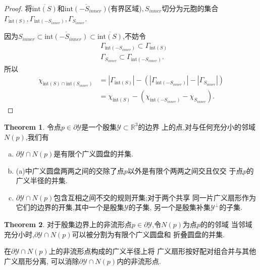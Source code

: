 \documentclass[a4paper]{book}
\numberwithin{equation}{chapter}
\theoremstyle{definition}
\newtheorem{thm}{Theorem}[chapter]
\begin{document}
\begin{proof}
    将$\overline{\text{int}(S)}$和$\overline{\text{int}(-S_{inner})}$(有界区域)$, S_{inner}$切分为元胞的集合
    $\varGamma_{\text{int}(S) }, 
    \varGamma_{\text{int}(-S_{inner})}, \varGamma_{S_{inner}}$.

    因为$ S_{inner} \subset \overline{\text{int}(-S_{inner})} \subset \overline{\text{int}(S)}$,不妨令
    \begin{align}
        &\varGamma_{\text{int}(-S_{inner})}  \subset \varGamma_{\text{int}(S)} \\
        &\varGamma_{S_{inner}} \subset \varGamma_{\text{int}(-S_{inner})} .
    \end{align}
    所以
    \begin{equation}
        \begin{aligned}
            \chi_{\text{int}(S) \cap \text{int}(S_{inner})} &= 
            \left| \varGamma_{\text{int}(S)} \right| - (\left|  \varGamma_{\text{int}(-S_{inner})} \right| 
            -  \left| \varGamma_{S_{inner}} \right|) \\
            &=  \chi_{\text{int}(S)} - (\chi_{\text{int}(-S_{inner})} - \chi_{S_{inner}}).
        \end{aligned}
    \end{equation}
\end{proof}

\begin{thm}
    令点$p \in \partial \mathcal{Y}$是一个殷集$\mathcal{Y} \subset \mathbb{R}^3$的边界
    上的点,对与任何充分小的邻域$N(p)$,我们有
    \begin{enumerate}[(a)]
        \item $\partial \mathcal{Y} \cap N(p)$是有限个广义圆盘的并集.
        \item (a)中广义圆盘两两之间的交除了点$p$以外是有限个两两之间交且仅交
        于点$p$的广义半径的并集.
        \item  $\partial \mathcal{Y} \cap N(p)$包含互相之间不交的规则开集;对于两个共享
        同一片广义扇形作为它们的边界的开集,其中一个是殷集$\mathcal{Y}$的子集,
        另一个是殷集补集$\mathcal{Y}^\bot $的子集.
    \end{enumerate}
\end{thm}

\begin{thm}
    对于殷集边界上的非流形点$p \in \partial \mathcal{Y}$,令$N(p)$为点$p$的的邻域
    当邻域充分小时,$\partial \mathcal{Y} \cap N(p)$可以被分割为有限个广义圆盘和
    折叠圆盘的并集.
    
    在$\partial \mathcal{Y} \cap N(p)$上的非流形点构成的广义半径上将
    广义扇形按好配对组合并与其他广义扇形分离,
    可以消除$\partial \mathcal{Y} \cap N(p)$内的非流形点.
\end{thm}
\end{document}
